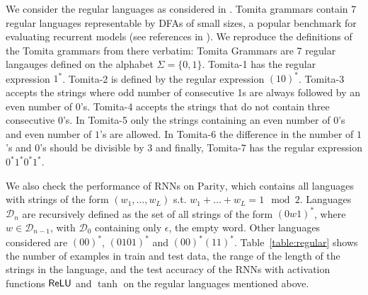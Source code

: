 We consider the regular languages as considered in \cite{BhattamishraAG20}.
Tomita grammars \cite{tomita:cogsci82} contain 7
regular languages representable by DFAs of small
sizes, a popular benchmark for evaluating recurrent models (see references in \cite{BhattamishraAG20}). 
We reproduce the definitions of the Tomita grammars from there verbatim:
Tomita Grammars are 7 regular langauges defined on the alphabet $\Sigma = \{0, 1\}$.
Tomita-1 has the regular expression $1^\ast$.
Tomita-2 is defined by the regular expression $(10)^\ast$.
Tomita-3 accepts the strings where odd number
of consecutive 1s are always followed by an even
number of $0$'s. Tomita-4 accepts the strings that
do not contain three consecutive $0$'s. In Tomita-5 only
the strings containing an even number of $0$'s and
even number of $1$'s are allowed. In Tomita-6 the
difference in the number of $1$'s and $0$'s should be
divisible by 3 and finally, Tomita-7 has the regular
expression $0^\ast 1^\ast 0^\ast 1^\ast$. 

We also check the performance of RNNs on $\mathrm{Parity}$, which contains all languages with strings of the form $(w_1, \ldots, w_L)$ s.t. $w_1 + \ldots + w_L = 1 \mod 2$. Languages $\mathcal{D}_n$ are recursively defined as the set of all strings of the form $(0w1)^{\ast}$, where $w \in \mathcal{D}_{n-1}$, with $\mathcal{D}_0$ containing only $\epsilon$, the empty word. Other languages considered are $(00)^{\ast}$, $(0101)^{\ast}$ and $(00)^{\ast}(11)^{\ast}$. Table~\ref{table:regular} shows the number of examples in train and test data, the range of the length of the strings in the language, and the test accuracy of the RNNs with activation functions $\mathsf{ReLU}$ and $\tanh$ on the regular languages mentioned above. 

